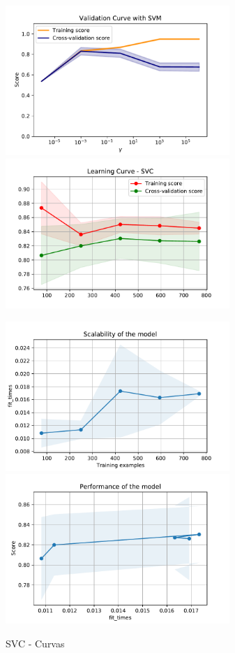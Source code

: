 \documentclass[12pt,twoside]{report}
\begin{document}
\begin{figure}[ht!]
\begin{multicols}{2}
\includegraphics[width=8.5cm]{./code/figures_python/validation_curves/svc.pdf}%
\columnbreak
\includegraphics[width=8.5cm]{./code/figures_python/learning_curves/svc.pdf}%
\end{multicols}

\begin{multicols}{2}
\includegraphics[width=8.5cm]{./code/figures_python/learning_curves/svc_scalability.pdf}%
\columnbreak
\includegraphics[width=8.5cm]{./code/figures_python/learning_curves/svc_performance.pdf}%
\end{multicols}
\caption{SVC - Curvas}
\label{svc:curves}
\end{figure}
\end{document}
